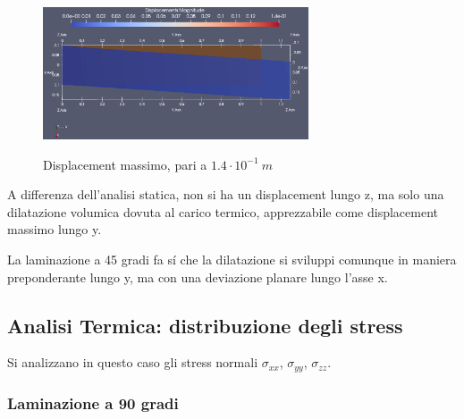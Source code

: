 \documentclass{article}
\begin{document}
            \begin{figure}[h!]
                 \label{fig:displacement_45_thermal}
                \centering
                \includegraphics[width=0.7\textwidth]{MUL2/Esercitazione3/MUL2_FEM/OUTPUT/static/Displacement_Z/displacement_thermal_45.eps}
                \caption{Displacement massimo, pari a $1.4 \cdot 10^{-1} \ m$}
            \end{figure}

            A differenza dell'analisi statica, non si ha un displacement lungo z, ma solo una dilatazione volumica dovuta
            al carico termico, apprezzabile come displacement massimo lungo y.

            La laminazione a 45 gradi fa sí che la dilatazione si sviluppi comunque in maniera preponderante lungo y, 
            ma con una deviazione planare lungo l'asse x.

            \clearpage

            \subsection{Analisi Termica: distribuzione degli stress \label{termica_stress}}

            Si analizzano in questo caso gli stress normali $\sigma_{xx}$, $\sigma_{yy}$, $\sigma_{zz}$.

            \subsubsection{Laminazione a 90 gradi\label{termica_stress_90}}
\end{document}
